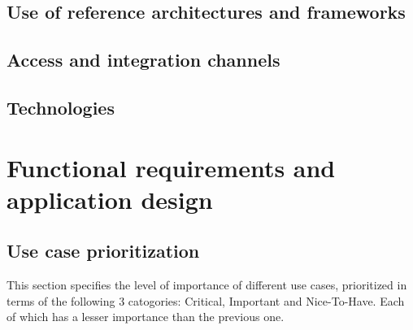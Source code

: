 \documentclass[11pt]{article}
\begin{document}
	\subsection{Use of reference architectures and frameworks}
	
	\subsection{Access and integration channels}
	
	\subsection{Technologies}
	
	\newpage
	
	\section{Functional requirements and application design}
	
	\subsection{Use case prioritization}
	This section specifies the level of importance of different use cases, prioritized in terms of the following 3 catogories: Critical, Important and Nice-To-Have. Each of which has a lesser importance than the previous one.
	
\end{document}
